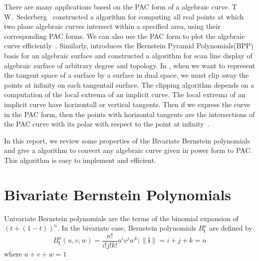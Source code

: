 \documentclass[reqno]{amsart}
\theoremstyle{plain}
\begin{document}
 There are many applications based on the PAC form of a algebraic curve. T W.~Sederberg~\cite{h1}  constructed a algorithm for computing all real points at which two plane algebraic curves intersect within a specified area, using their corresponding PAC forms.  We can also use the PAC form to plot the algebraic curve efficiently~\cite{h5}. Similarly, \cite{h4} introduces the Bernstein Pyramid Polynomials(BPP) basis for an algebraic surface and constructed a algorithm for scan line display of algebraic surface of arbitrary degree and topology. 
In \cite{h6}, when we want to represent the tangent space of a surface by a surface in dual space, we must clip away the points at infinity on each tangentail surface.  The clipping algorithm depends on a computation of the local extrema of an implicit curve. The local extrema of an implicit curve have horizontall or vertical tangents.  Then if we express the curve in the PAC form,  then the points with horizontal tangents are the intersections of the PAC curve with its polar with respect to the point at infinity~\cite{h1}.





In this report, we review some properties of the Bivariate Bernstein polynomials and give a algorithm to convert any algebraic curve given in power form to PAC. This algorithm is easy to implement and efficient.


\section{Bivariate Bernstein Polynomials}\label{S:b}
 Univariate Bernstein polynomials are the terms of the binomial
 expansion of $(t+(1-t))^{n}$.  In the bivariate case, Bernstein
 polynomials $B_{\mathbf{i}}^{n}$ are defined by
 \begin{equation}\label{e1}
 B_{\mathbf{i}}^{n}(u,v,w) = \frac{n!}{i!j!k!}u^{i}v^{j}w^{k};
 \|\mathbf{i}\|=i+j+k=n
 \end{equation}
 where $ u+v+w = 1$
\end{document}
